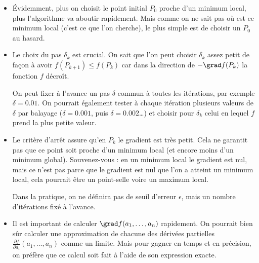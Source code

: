 	\begin{itemize}
		\item \'Evidemment, plus on choisit le point initial $P_0$ proche d'un minimum local, plus l'algorithme va aboutir rapidement. Mais comme on ne sait pas où est ce minimum local (c'est ce que l'on cherche), le plus simple est de choisir un $P_0$ au hasard.
		
		\item Le choix du pas $\delta_k$ est crucial. On sait que l'on peut choisir $\delta_k$ assez petit de façon à avoir $f(P_{k+1}) \le f(P_k)$ car dans la direction de $-\grad f(P_k)$ la fonction $f$ décroît.
		
		
		On peut fixer à l'avance un pas $\delta$ commun à toutes les itérations, par exemple $\delta = 0.01$. On pourrait également tester à chaque itération plusieurs valeurs de $\delta$ par balayage ($\delta = 0.001$, puis $\delta=0.002$\ldots) et choisir pour $\delta_k$ celui en lequel $f$ prend la plus petite valeur.
		
		\item Le critère d'arrêt assure qu'en $P_k$ le gradient est très petit. Cela ne garantit pas que ce point soit proche d'un minimum local (et encore moins d'un minimum global). Souvenez-vous : en un minimum local le gradient est nul, mais ce n'est pas parce que le gradient est nul que l'on a atteint un minimum local, cela pourrait être un point-selle voire un maximum local.
		
		Dans la pratique, on ne définira pas de seuil d'erreur $\epsilon$, mais un nombre d'itérations fixé à l'avance.
		
		\item Il est important de calculer $\grad f(a_1,\ldots,a_n)$ rapidement. On pourrait bien sûr calculer une approximation de chacune des dérivées partielles $\frac{\partial f}{\partial a_i}(a_1,\ldots,a_n)$ comme un limite. Mais pour gagner en temps et en précision, on préfère que ce calcul soit fait à l'aide de son expression exacte. 
		
	\end{itemize}

